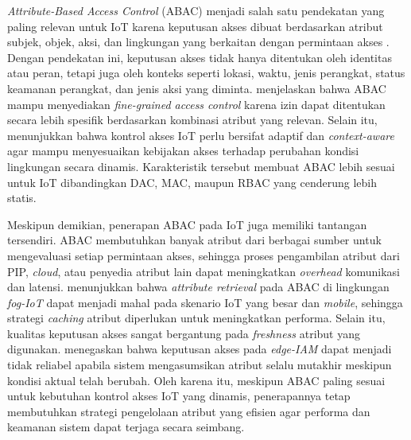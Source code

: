 \textit{Attribute-Based Access Control} (ABAC) menjadi salah satu pendekatan yang paling relevan untuk IoT karena keputusan akses dibuat berdasarkan atribut subjek, objek, aksi, dan lingkungan yang berkaitan dengan permintaan akses \parencite{hu_guide_2014}. Dengan pendekatan ini, keputusan akses tidak hanya ditentukan oleh identitas atau peran, tetapi juga oleh konteks seperti lokasi, waktu, jenis perangkat, status keamanan perangkat, dan jenis aksi yang diminta. \textcite{diaz_authorization_2025} menjelaskan bahwa ABAC mampu menyediakan \textit{fine-grained access control} karena izin dapat ditentukan secara lebih spesifik berdasarkan kombinasi atribut yang relevan. Selain itu, \textcite{kalaria_adaptive_2024} menunjukkan bahwa kontrol akses IoT perlu bersifat adaptif dan \textit{context-aware} agar mampu menyesuaikan kebijakan akses terhadap perubahan kondisi lingkungan secara dinamis. Karakteristik tersebut membuat ABAC lebih sesuai untuk IoT dibandingkan DAC, MAC, maupun RBAC yang cenderung lebih statis.

Meskipun demikian, penerapan ABAC pada IoT juga memiliki tantangan tersendiri. ABAC membutuhkan banyak atribut dari berbagai sumber untuk mengevaluasi setiap permintaan akses, sehingga proses pengambilan atribut dari PIP, \textit{cloud}, atau penyedia atribut lain dapat meningkatkan \textit{overhead} komunikasi dan latensi. \textcite{cremonezi_improving_2022} menunjukkan bahwa \textit{attribute retrieval} pada ABAC di lingkungan \textit{fog-IoT} dapat menjadi mahal pada skenario IoT yang besar dan \textit{mobile}, sehingga strategi \textit{caching} atribut diperlukan untuk meningkatkan performa. Selain itu, kualitas keputusan akses sangat bergantung pada \textit{freshness} atribut yang digunakan. \textcite{wang_edge-enabled_2025} menegaskan bahwa keputusan akses pada \textit{edge-IAM} dapat menjadi tidak reliabel apabila sistem mengasumsikan atribut selalu mutakhir meskipun kondisi aktual telah berubah. Oleh karena itu, meskipun ABAC paling sesuai untuk kebutuhan kontrol akses IoT yang dinamis, penerapannya tetap membutuhkan strategi pengelolaan atribut yang efisien agar performa dan keamanan sistem dapat terjaga secara seimbang. 